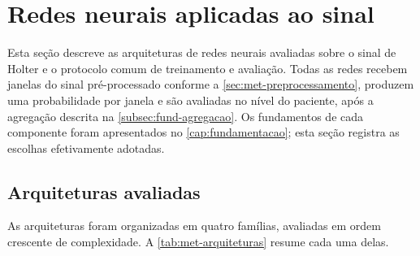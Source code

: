 %
%
%

\section{Redes neurais aplicadas ao sinal}
\label{sec:met-redes}

Esta seção descreve as arquiteturas de redes neurais avaliadas sobre o sinal
de Holter e o protocolo comum de treinamento e avaliação. Todas as redes
recebem janelas do sinal pré-processado conforme a
\autoref{sec:met-preprocessamento}, produzem uma probabilidade por janela e
são avaliadas no nível do paciente, após a agregação descrita na
\autoref{subsec:fund-agregacao}. Os fundamentos de cada componente foram
apresentados no \autoref{cap:fundamentacao}; esta seção registra as escolhas
efetivamente adotadas.

\subsection{Arquiteturas avaliadas}
\label{subsec:met-arquiteturas}

As arquiteturas foram organizadas em quatro famílias, avaliadas em ordem
crescente de complexidade. A \autoref{tab:met-arquiteturas} resume cada uma
delas.

